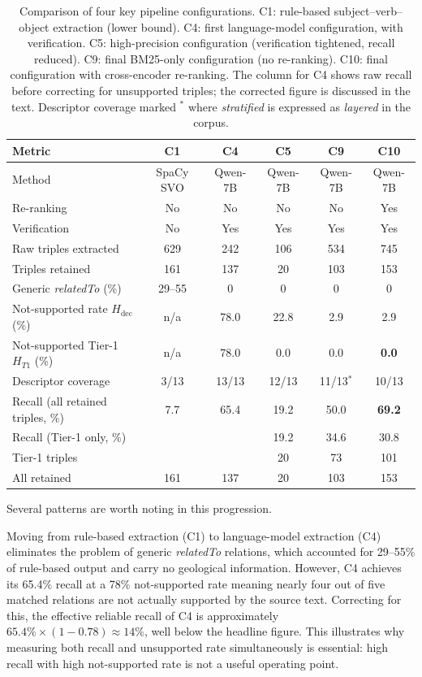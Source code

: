 \documentclass[10pt]{article}
\begin{document}
\begin{table}[htb]
\centering
\caption{Comparison of four key pipeline configurations.
  C1: rule-based subject--verb--object extraction (lower bound).
  C4: first language-model configuration, with verification.
  C5: high-precision configuration (verification tightened,
  recall reduced).
  C9: final BM25-only configuration (no re-ranking).
  C10: final configuration with cross-encoder re-ranking.
  The column for C4 shows raw recall before correcting for
  unsupported triples; the corrected figure is discussed in
  the text.
  Descriptor coverage marked $^*$ where \emph{stratified}
  is expressed as \emph{layered} in the corpus.}
\label{tab:runs}
\setlength{\tabcolsep}{5pt}
\small
\begin{tabular}{lccccc}
\toprule
\textbf{Metric}
  & \textbf{C1}
  & \textbf{C4}
  & \textbf{C5}
  & \textbf{C9}
  & \textbf{C10} \\
\midrule
Method
  & SpaCy SVO & Qwen-7B & Qwen-7B & Qwen-7B & Qwen-7B \\
Re-ranking
  & No & No & No & No & Yes \\
Verification
  & No & Yes & Yes & Yes & Yes \\
\midrule
Raw triples extracted  & 629 & 242 & 106 & 534 & 745 \\
Triples retained   & 161 & 137 &  20 & 103 & 153 \\
\midrule
Generic \emph{relatedTo} (\%)
  & 29--55 & 0 & 0 & 0 & 0 \\
\midrule
Not-supported rate $H_{\text{dec}}$ (\%)
  & n/a & 78.0 & 22.8 & 2.9 & 2.9 \\
Not-supported Tier-1 $H_{T1}$ (\%)
  & n/a & 78.0 & 0.0  & 0.0 & \textbf{0.0} \\
\midrule
Descriptor coverage
  & 3/13 & 13/13 & 12/13 & 11/13$^*$ & 10/13 \\
Recall (all retained triples, \%)
  & 7.7 & 65.4 & 19.2 & 50.0 & \textbf{69.2} \\
Recall (Tier-1 only, \%)
  &  &  & 19.2 & 34.6 & 30.8 \\
\midrule
Tier-1 triples  &  &  &  20 &  73 & 101 \\
All retained  & 161 & 137 &  20 & 103 & 153 \\
\bottomrule
\end{tabular}
\end{table}

Several patterns are worth noting in this progression.

Moving from rule-based extraction (C1) to language-model extraction
(C4) eliminates the problem of generic \emph{relatedTo} relations,
which accounted for 29--55\% of rule-based output and carry no
geological information.
However, C4 achieves its 65.4\% recall at a 78\% not-supported
rate  meaning nearly four out of five matched relations are
not actually supported by the source text.
Correcting for this, the effective reliable recall of C4 is
approximately $65.4\% \times (1 - 0.78) \approx 14\%$,
well below the headline figure.
This illustrates why measuring both recall and unsupported rate
simultaneously is essential: high recall with high not-supported
rate is not a useful operating point.
\end{document}
